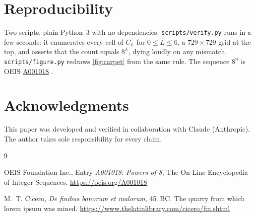 \documentclass[11pt]{amsart}
\theoremstyle{definition}
\theoremstyle{remark}
\begin{document}
\section{Reproducibility}

Two scripts, plain Python~3 with no dependencies. \texttt{scripts/verify.py} runs in a few seconds: it enumerates every cell of $C_L$ for $0 \le L \le 6$, a $729 \times 729$ grid at the top, and asserts that the count equals $8^L$, dying loudly on any mismatch. \texttt{scripts/figure.py} redraws \cref{fig:carpet} from the same rule. The sequence $8^n$ is OEIS \href{https://oeis.org/A001018}{A001018} \cite{oeis}.

\section*{Acknowledgments}

This paper was developed and verified in collaboration with Claude (Anthropic). The author takes sole responsibility for every claim.

\begin{thebibliography}{9}

OEIS Foundation Inc., Entry \emph{A001018: Powers of 8}, The On-Line Encyclopedia of Integer Sequences. \url{https://oeis.org/A001018}

M.~T. Cicero, \emph{De finibus bonorum et malorum}, 45~BC. The quarry from which lorem ipsum was mined. \url{https://www.thelatinlibrary.com/cicero/fin.shtml}

\end{thebibliography}
\end{document}
